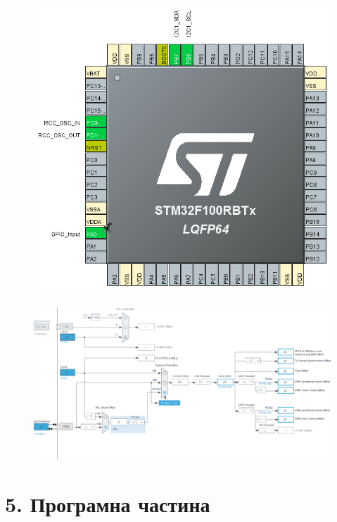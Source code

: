 \documentclass[14pt,a4paper]{scrartcl}
\begin{document}
\begin{figure}[!h]\TopFloatBoxes\CenterFloatBoxes
{}
{\includegraphics[scale=0.5]{pinout.png}}
\end{figure}


\begin{figure}[!h]\TopFloatBoxes\CenterFloatBoxes
{}
{\includegraphics[scale=0.5]{clock.png}}
\end{figure}


\newpage
\section*{\textrm{5. Програмна частина}}
\end{document}
